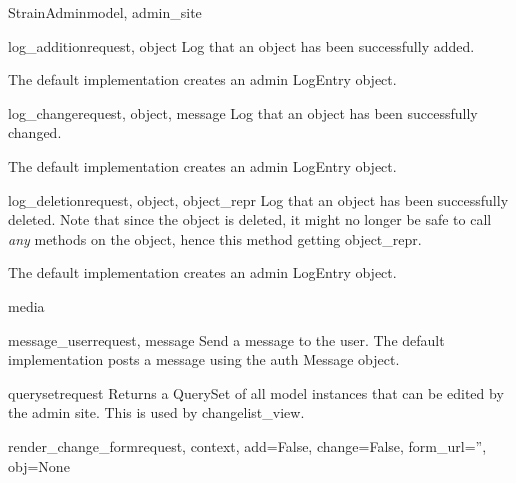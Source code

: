 \documentclass[letterpaper,10pt,english]{sphinxmanual}
\begin{document}
\begin{classdesc}{StrainAdmin}{model, admin\_site}
\hypertarget{animal.admin.StrainAdmin.log_addition}{}\begin{methoddesc}{log\_addition}{request, object}
Log that an object has been successfully added.

The default implementation creates an admin LogEntry object.
\end{methoddesc}

\hypertarget{animal.admin.StrainAdmin.log_change}{}\begin{methoddesc}{log\_change}{request, object, message}
Log that an object has been successfully changed.

The default implementation creates an admin LogEntry object.
\end{methoddesc}

\hypertarget{animal.admin.StrainAdmin.log_deletion}{}\begin{methoddesc}{log\_deletion}{request, object, object\_repr}
Log that an object has been successfully deleted. Note that since the
object is deleted, it might no longer be safe to call \emph{any} methods
on the object, hence this method getting object\_repr.

The default implementation creates an admin LogEntry object.
\end{methoddesc}

\hypertarget{animal.admin.StrainAdmin.media}{}\begin{memberdesc}{media}\end{memberdesc}

\hypertarget{animal.admin.StrainAdmin.message_user}{}\begin{methoddesc}{message\_user}{request, message}
Send a message to the user. The default implementation
posts a message using the auth Message object.
\end{methoddesc}

\hypertarget{animal.admin.StrainAdmin.queryset}{}\begin{methoddesc}{queryset}{request}
Returns a QuerySet of all model instances that can be edited by the
admin site. This is used by changelist\_view.
\end{methoddesc}

\hypertarget{animal.admin.StrainAdmin.render_change_form}{}\begin{methoddesc}{render\_change\_form}{request, context, add=False, change=False, form\_url='', obj=None}\end{methoddesc}


\end{classdesc}
\end{document}
